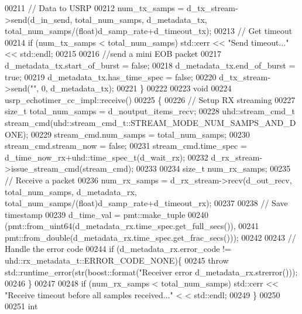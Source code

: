 \begin{DoxyCode}
00211         \textcolor{comment}{// Data to USRP}
00212         num\_tx\_samps = d_tx_stream->send(d_in_send, total\_num\_samps, 
      d_metadata_tx, total\_num\_samps/(\textcolor{keywordtype}{float})d_samp_rate+d_timeout_tx);
00213         \textcolor{comment}{// Get timeout}
00214         \textcolor{keywordflow}{if} (num\_tx\_samps < total\_num\_samps) std::cerr << \textcolor{stringliteral}{"Send timeout..."} << std::endl;
00215 
00216         \textcolor{comment}{//send a mini EOB packet}
00217         d_metadata_tx.start\_of\_burst = \textcolor{keyword}{false};
00218         d_metadata_tx.end\_of\_burst = \textcolor{keyword}{true};
00219         d_metadata_tx.has\_time\_spec = \textcolor{keyword}{false};
00220         d_tx_stream->send(\textcolor{stringliteral}{""}, 0, d_metadata_tx);
00221     \}
00222 
00223     \textcolor{keywordtype}{void}
00224     usrp_echotimer_cc_impl::receive()
00225     \{
00226         \textcolor{comment}{// Setup RX streaming}
00227         \textcolor{keywordtype}{size\_t} total\_num\_samps = d_noutput_items_recv;
00228         uhd::stream\_cmd\_t stream\_cmd(uhd::stream\_cmd\_t::STREAM\_MODE\_NUM\_SAMPS\_AND\_DONE);
00229         stream\_cmd.num\_samps = total\_num\_samps;
00230         stream\_cmd.stream\_now = \textcolor{keyword}{false};
00231         stream\_cmd.time\_spec = d_time_now_rx+uhd::time\_spec\_t(d_wait_rx);
00232         d_rx_stream->issue\_stream\_cmd(stream\_cmd);
00233 
00234         \textcolor{keywordtype}{size\_t} num\_rx\_samps;
00235         \textcolor{comment}{// Receive a packet}
00236         num\_rx\_samps = d_rx_stream->recv(d_out_recv, total\_num\_samps, 
      d_metadata_rx, total\_num\_samps/(\textcolor{keywordtype}{float})d_samp_rate+d_timeout_rx);
00237 
00238         \textcolor{comment}{// Save timestamp}
00239         d_time_val = pmt::make\_tuple
00240             (pmt::from\_uint64(d_metadata_rx.time\_spec.get\_full\_secs()),
00241              pmt::from\_double(d_metadata_rx.time\_spec.get\_frac\_secs()));
00242 
00243         \textcolor{comment}{// Handle the error code}
00244         \textcolor{keywordflow}{if} (d_metadata_rx.error\_code != uhd::rx\_metadata\_t::ERROR\_CODE\_NONE)\{
00245             \textcolor{keywordflow}{throw} std::runtime\_error(str(boost::format(\textcolor{stringliteral}{"Receiver error %
      d_metadata_rx.strerror()));
00246         \}
00247 
00248         \textcolor{keywordflow}{if} (num\_rx\_samps < total\_num\_samps) std::cerr << \textcolor{stringliteral}{"Receive timeout before all samples received..."} <
      < std::endl;
00249     \}
00250 
00251     \textcolor{keywordtype}{int}
}
\end{DoxyCode}
